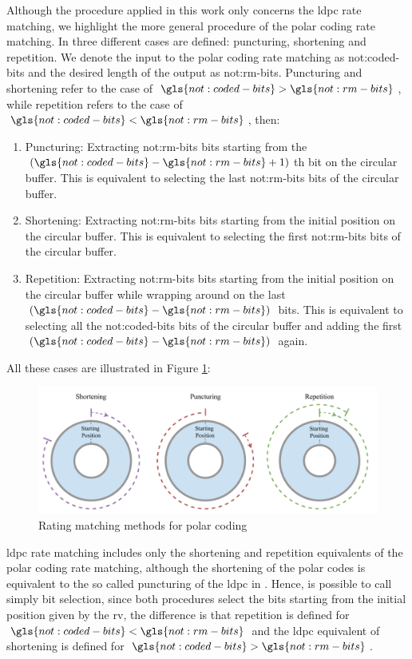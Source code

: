 Although the procedure applied in this work only concerns the \gls{ldpc} rate matching, we highlight the more general procedure of the polar coding rate matching.
%
In \cite{Hui2018} three different cases are defined: puncturing, shortening and repetition.
%
We denote the input to the polar coding rate matching as \gls{not:coded-bits} and the desired length of the output as \gls{not:rm-bits}.
%
Puncturing and shortening refer to the case of $\gls{not:coded-bits} > \gls{not:rm-bits}$, while repetition refers to the case of $\gls{not:coded-bits} < \gls{not:rm-bits}$, then:
%
\begin{enumerate}
    \item Puncturing: Extracting \gls{not:rm-bits} bits starting from the $(\gls{not:coded-bits} - \gls{not:rm-bits} + 1)$th bit on the circular buffer. This is equivalent to selecting the last \gls{not:rm-bits} bits of the circular buffer.
    \item Shortening: Extracting \gls{not:rm-bits} bits starting from the initial position on the circular buffer. This is equivalent to selecting the first \gls{not:rm-bits} bits of the circular buffer.
    \item Repetition: Extracting \gls{not:rm-bits} bits starting from the initial position on the circular buffer while wrapping around on the last $(\gls{not:coded-bits} - \gls{not:rm-bits})$ bits. This is equivalent to selecting all the \gls{not:coded-bits} bits of the circular buffer and adding the first $(\gls{not:coded-bits} - \gls{not:rm-bits})$ again.
\end{enumerate}
%
All these cases are illustrated in Figure \ref{fig:rate-matching}:

\begin{figure}[htb]
    \includegraphics[width=\columnwidth]{figures/chp_theory/rate-matching.pdf}
    \caption{Rating matching methods for polar coding}
    \label{fig:rate-matching}
\end{figure}

\Gls{ldpc} rate matching includes only the shortening and repetition equivalents of the polar coding rate matching, although the shortening of the polar codes is equivalent to the so called puncturing of the \gls{ldpc} in \cite{Hui2018}.
%
Hence, is possible to call simply bit selection, since both procedures select the bits starting from the initial position given by the \gls{rv}, the difference is that repetition is defined for $\gls{not:coded-bits} < \gls{not:rm-bits}$ and the \gls{ldpc} equivalent of shortening is defined for $\gls{not:coded-bits} > \gls{not:rm-bits}$.

